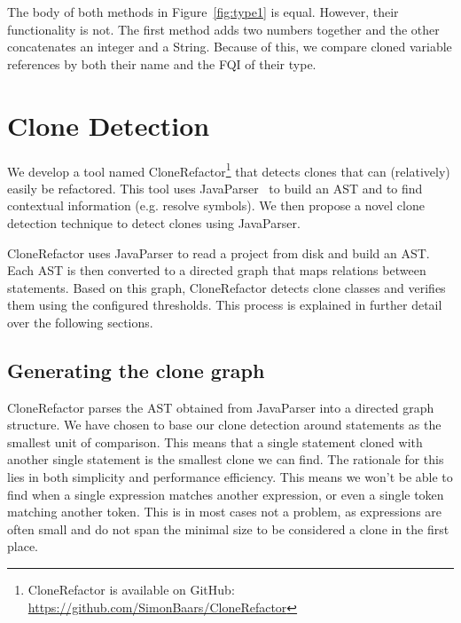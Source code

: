 \documentclass[conference]{IEEEtran}
\begin{document}
The body of both methods in Figure~\ref{fig:type1} is equal. However, their functionality is not. The first method adds two numbers together and the other concatenates an integer and a String. Because of this, we compare cloned variable references by both their name and the FQI of their type.

\section{Clone Detection}\label{sec:clonedetection}
We develop a tool named CloneRefactor\footnote{CloneRefactor is available on GitHub: \url{https://github.com/SimonBaars/CloneRefactor}} that detects clones that can (relatively) easily be refactored. This tool uses JavaParser~\cite{tomassetti2017javaparser} to build an AST and to find contextual information (e.g. resolve symbols). We then propose a novel clone detection technique to detect clones using JavaParser.


CloneRefactor uses JavaParser to read a project from disk and build an AST. %
Each AST is then converted to a directed graph that maps relations between statements. Based on this graph, CloneRefactor detects clone classes and verifies them using the configured thresholds. This process is explained in further detail over the following sections.


\subsection{Generating the clone graph}\label{sec:clonegraph}
CloneRefactor parses the AST obtained from JavaParser into a directed graph structure. We have chosen to base our clone detection around statements as the smallest unit of comparison. This means that a single statement cloned with another single statement is the smallest clone we can find. The rationale for this lies in both simplicity and performance efficiency. This means we won't be able to find when a single expression matches another expression, or even a single token matching another token. This is in most cases not a problem, as expressions are often small and do not span the minimal size to be considered a clone in the first place.
\end{document}
